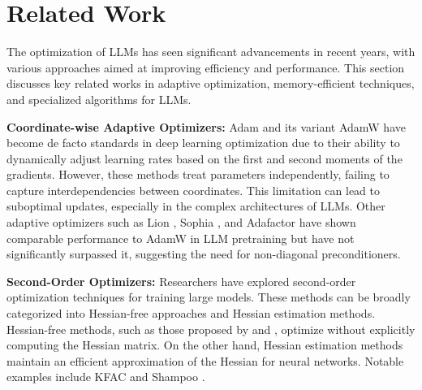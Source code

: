 \section{Related Work}
The optimization of LLMs has seen significant advancements in recent years, with various approaches aimed at improving efficiency and performance. This section discusses key related works in adaptive optimization, memory-efficient techniques, and specialized algorithms for LLMs.

\noindent\textbf{Coordinate-wise Adaptive Optimizers:} Adam \citep{kingma2014adam} and its variant AdamW \citep{loshchilov2017decoupled} have become de facto standards in deep learning optimization due to their ability to dynamically adjust learning rates based on the first and second moments of the gradients. However, these methods treat parameters independently, failing to capture interdependencies between coordinates. This limitation can lead to suboptimal updates, especially in the complex architectures of LLMs. Other adaptive optimizers such as Lion \citep{chen2023symbolic}, Sophia \citep{liu2023sophia}, and Adafactor \citep{shazeer2018adafactor,zhai2022scaling} have shown comparable performance to AdamW in LLM pretraining but have not significantly surpassed it, suggesting the need for non-diagonal preconditioners.

\noindent\textbf{Second-Order Optimizers:} Researchers have explored second-order optimization techniques for training large models. These methods can be broadly categorized into Hessian-free approaches and Hessian estimation methods. Hessian-free methods, such as those proposed by \citet{martens2010deep} and \citet{martens2015optimizing}, optimize without explicitly computing the Hessian matrix. On the other hand, Hessian estimation methods maintain an efficient approximation of the Hessian for neural networks. Notable examples include KFAC \citep{martens2015optimizing} and Shampoo \citep{gupta2018shampoo}.

